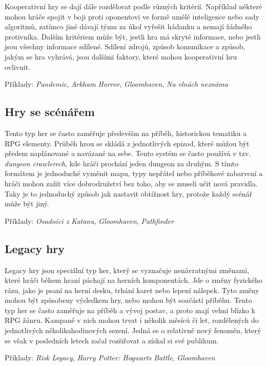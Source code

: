 Kooperativní hry se dají dále rozdělovat podle různých kritérií. Například některé mohou hráče spojit v boji proti oponentovi ve formě umělé inteligence nebo sady algoritmů, zatímco jiné dávají týmu za úkol vyřešit hádanku a nemají žádného protivníka. Dalším kritériem může být, jestli hra má skryté informace, nebo jestli jsou všechny informace sdílené. Sdílení zdrojů, způsob komunikace a způsob, jakým se hra vyhrává, jsou dalšími faktory, které mohou kooperativní hru ovlivnit.

Příklady: \textit{Pandemic}, \textit{Arkham Horror}, \textit{Gloomhaven}, \textit{Na vlnách neznáma}


\subsection{Hry se scénářem}
\label{subsec:structure_scenario}

Tento typ her se často zaměřuje především na příběh, historickou tematiku a RPG elementy. Průběh hrou se skládá z jednotlivých epizod, které můžou být předem naplánované a navázané na sebe. Tento systém se často používá v tzv. \textit{dungeon crawlerech}, kde hráči prochází jeden dungeon za druhým. S tímto formátem je jednoduché vyměnit mapu, typy nepřátel nebo příběhové zabarvení a hráči mohou zažít více dobrodružství bez toho, aby se museli učit nová pravidla. Taky je to jednoduchý způsob jak nastavit obtížnost hry, protože každý scénář může být jiný.

Příklady: \textit{Osadníci z Katanu}, \textit{Gloomhaven}, \textit{Pathfinder}

\subsection{Legacy hry}
\label{subsec:structure_legacy}

Legacy hry jsou speciální typ her, který se vyznačuje nenávratnými změnami, které hráči během hraní páchají na herních komponentách. Jde o změny fyzického rázu, jako je psaní na herní desku, trhání karet nebo lepení nálepek. Tyto změny mohou být způsobeny výsledkem hry, nebo mohou být součástí příběhu. Tento typ her se často zaměřuje na příběh a vývoj postav, a proto mají velmi blízko k RPG žánru. Kampaně v nich mohou trvat i několik měsíců či let, rozdělených do jednotlivých několikahodinových sezení. Jedná se o relativně nový fenomén, který se však v posledních letech začal rozšiřovat a získal si své publikum.

Příklady: \textit{Risk Legacy}, \textit{Harry Potter: Hogwarts Battle}, \textit{Gloomhaven}


